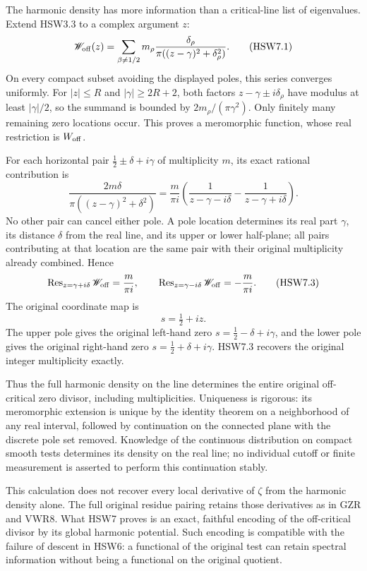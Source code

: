 The harmonic density has more information than a critical-line list of
eigenvalues. Extend HSW3.3 to a complex argument \(z\): \[
\mathscr W_{\rm off}(z)=
\sum_{\beta\ne1/2}
m_\rho\frac{\delta_\rho}{\pi((z-\gamma)^2+\delta_\rho^2)}.
\tag{HSW7.1}
\] On every compact subset avoiding the displayed poles, this series
converges uniformly. For \(|z|\le R\) and \(|\gamma|\ge2R+2\), both
factors \(z-\gamma\pm i\delta_\rho\) have modulus at least
\(|\gamma|/2\), so the summand is bounded by \(2m_\rho/(\pi\gamma^2)\).
Only finitely many remaining zero locations occur. This proves a
meromorphic function, whose real restriction is \(W_{\rm off}\).

For each horizontal pair \(\tfrac12\pm\delta+i\gamma\) of multiplicity
\(m\), its exact rational contribution is \[
\frac{2m\delta}{\pi((z-\gamma)^2+\delta^2)}
=\frac{m}{\pi i}\left(
\frac1{z-\gamma-i\delta}-\frac1{z-\gamma+i\delta}\right).
\tag{HSW7.2}
\] No other pair can cancel either pole. A pole location determines its
real part \(\gamma\), its distance \(\delta\) from the real line, and
its upper or lower half-plane; all pairs contributing at that location
are the same pair with their original multiplicity already combined.
Hence \[
\operatorname{Res}_{z=\gamma+i\delta}\mathscr W_{\rm off}
=\frac{m}{\pi i},\qquad
\operatorname{Res}_{z=\gamma-i\delta}\mathscr W_{\rm off}
=-\frac{m}{\pi i}.
\tag{HSW7.3}
\] The original coordinate map is \[
s=\tfrac12+iz.
\tag{HSW7.4}
\] The upper pole gives the original left-hand zero
\(s=\tfrac12-\delta+i\gamma\), and the lower pole gives the original
right-hand zero \(s=\tfrac12+\delta+i\gamma\). HSW7.3 recovers the
original integer multiplicity exactly.

Thus the full harmonic density on the line determines the entire
original off-critical zero divisor, including multiplicities. Uniqueness
is rigorous: its meromorphic extension is unique by the identity theorem
on a neighborhood of any real interval, followed by continuation on the
connected plane with the discrete pole set removed. Knowledge of the
continuous distribution on compact smooth tests determines its density
on the real line; no individual cutoff or finite measurement is asserted
to perform this continuation stably.

This calculation does not recover every local derivative of \(\zeta\)
from the harmonic density alone. The full original residue pairing
retains those derivatives as in GZR and VWR8. What HSW7 proves is an
exact, faithful encoding of the off-critical divisor by its global
harmonic potential. Such encoding is compatible with the failure of
descent in HSW6: a functional of the original test can retain spectral
information without being a functional on the original quotient.

